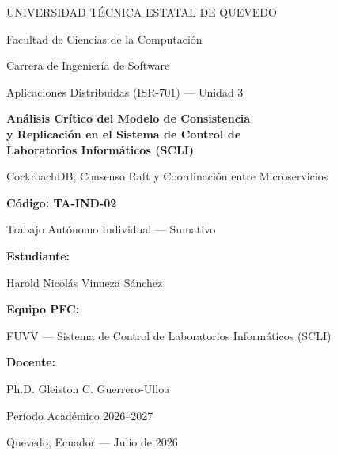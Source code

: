 \documentclass[12pt,letterpaper]{article}
\begin{document}
\begin{titlepage}
\centering
\vspace*{1.5cm}

{\large UNIVERSIDAD T\'ECNICA ESTATAL DE QUEVEDO\par}
{\normalsize Facultad de Ciencias de la Computaci\'on\par}
{\normalsize Carrera de Ingenier\'ia de Software\par}
\vspace{0.3cm}
{\normalsize Aplicaciones Distribuidas (ISR-701) --- Unidad 3\par}

\vspace{2cm}
{\Large\bfseries An\'alisis Cr\'itico del Modelo de Consistencia \\
y Replicaci\'on en el Sistema de Control de \\
Laboratorios Inform\'aticos (SCLI)\par}

\vspace{0.5cm}
{\normalsize CockroachDB, Consenso Raft y Coordinaci\'on entre Microservicios\par}

\vspace{2cm}
{\normalsize\bfseries C\'odigo: TA-IND-02\par}
{\normalsize Trabajo Aut\'onomo Individual --- Sumativo\par}

\vspace{1.5cm}
{\normalsize\bfseries Estudiante:\par}
{\normalsize Harold Nicol\'as Vinueza S\'anchez\par}

\vspace{0.8cm}
{\normalsize\bfseries Equipo PFC:\par}
{\normalsize FUVV --- Sistema de Control de Laboratorios Inform\'aticos (SCLI)\par}

\vspace{0.8cm}
{\normalsize\bfseries Docente:\par}
{\normalsize Ph.D. Gleiston C. Guerrero-Ulloa\par}

\vspace{1.5cm}
{\normalsize Per\'iodo Acad\'emico 2026--2027\par}
{\normalsize Quevedo, Ecuador --- Julio de 2026\par}

\vfill
\end{titlepage}
\end{document}
